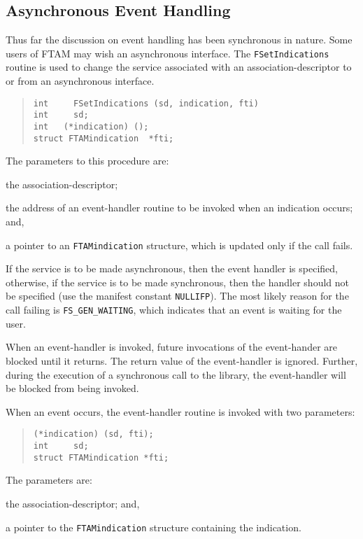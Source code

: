 \subsection	{Asynchronous Event Handling}
Thus far the discussion on event handling has been synchronous in nature.
Some users of FTAM may wish an asynchronous interface.
The \verb"FSetIndications" routine is used to change the service associated
with an association-descriptor to or from an asynchronous interface.
\begin{quote}\small\begin{verbatim}
int     FSetIndications (sd, indication, fti)
int     sd;
int   (*indication) ();
struct FTAMindication  *fti;
\end{verbatim}\end{quote}
The parameters to this procedure are:
\begin{describe}
\item[\verb"sd":] the association-descriptor;

\item[\verb"indication":] the address of an event-handler routine to be
invoked when an indication occurs;
and,

\item[\verb"fti":] a pointer to an \verb"FTAMindication" structure, which is
updated only if the call fails.
\end{describe}
If the service is to be made asynchronous,
then the event handler is specified,
otherwise,
if the service is to be made synchronous,
then the handler should not be specified
(use the manifest constant \verb"NULLIFP").
The most likely reason for the call failing is \verb"FS_GEN_WAITING",
which indicates that an event is waiting for the user.

When an event-handler is invoked,
future invocations of the event-hander are blocked until it returns.
The return value of the event-handler is ignored.
Further,
during the execution of a synchronous call to the library,
the event-handler will be blocked from being invoked.

When an event occurs,
the event-handler routine is invoked with two parameters:
\begin{quote}\small\begin{verbatim}
(*indication) (sd, fti);
int     sd;
struct FTAMindication *fti;
\end{verbatim}\end{quote}
The parameters are:
\begin{describe}
\item[\verb"sd":] the association-descriptor;
and,

\item[\verb"fti":] a pointer to the \verb"FTAMindication" structure containing
the indication.
\end{describe}

